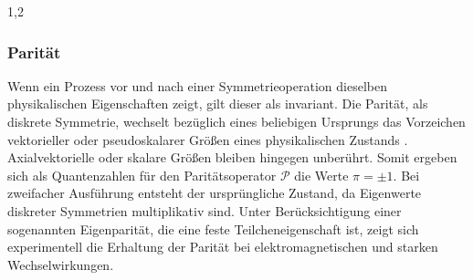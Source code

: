 \documentclass[11pt,a4paper,twoside]{report}
\begin{document}
\begin{spacing}{1,2}
\subsubsection{Parität}
\label{sec_parity}
Wenn ein Prozess vor und nach einer Symmetrieoperation dieselben physikalischen Eigenschaften zeigt, gilt dieser als invariant. Die Parität, als diskrete Symmetrie, wechselt bezüglich 
eines beliebigen Ursprungs das Vorzeichen vektorieller oder pseudoskalarer Größen eines physikalischen Zustands \cite{Klapdor}. Axialvektorielle oder skalare Größen bleiben
hingegen unberührt. Somit ergeben sich als Quantenzahlen für den Paritätsoperator $\mathcal{P}$ die Werte $\pi = \pm1$. Bei zweifacher Ausführung entsteht 
der ursprüngliche Zustand, da Eigenwerte diskreter Symmetrien multiplikativ sind. Unter Berücksichtigung einer sogenannten Eigenparität, die eine feste
Teilcheneigenschaft ist, zeigt sich experimentell die Erhaltung der Parität bei elektromagnetischen und starken Wechselwirkungen.


\end{spacing}
\end{document}
